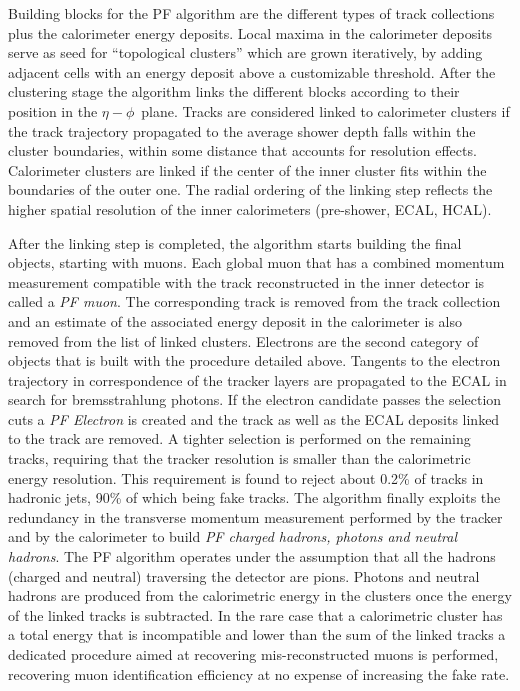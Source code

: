 Building blocks for the PF algorithm are the different types of track collections plus the calorimeter energy deposits. Local maxima in the calorimeter deposits serve as seed for ``topological clusters'' which are grown iteratively, by adding adjacent cells with an energy deposit above a customizable threshold. After the clustering stage the algorithm links the different blocks according to their position in the $\eta-\phi$\ plane. Tracks are considered linked to calorimeter clusters if the track trajectory propagated to the average shower depth falls within the cluster boundaries, within some distance that accounts for resolution effects. Calorimeter clusters are linked if the center of the inner cluster fits within the boundaries of the outer one. The radial ordering of the linking step reflects the higher spatial resolution of the inner calorimeters (pre-shower, ECAL, HCAL). 

After the linking step is completed, the algorithm starts building the final objects, starting with muons. Each global muon that has a combined momentum measurement compatible with the track reconstructed in the inner detector is called a \emph{PF muon}. The corresponding track is removed from the track collection and an estimate of the associated energy deposit in the calorimeter is also removed from the list of linked clusters. Electrons are the second category of objects that is built with the procedure detailed above. Tangents to the electron trajectory in correspondence of the tracker layers are propagated to the ECAL in search for bremsstrahlung photons. If the electron candidate passes the selection cuts a \emph{PF Electron} is created and the track as well as the ECAL deposits linked to the track are removed. A tighter selection is performed on the remaining tracks, requiring that the tracker \pT resolution is smaller than the calorimetric energy resolution. This requirement is found to reject about 0.2\% of tracks in hadronic jets, 90\% of which being fake tracks. 
The algorithm finally exploits the redundancy in the transverse momentum measurement performed by the tracker and by the calorimeter to build \emph{PF charged hadrons, photons and neutral hadrons}. The PF algorithm operates under the assumption that all the hadrons (charged and neutral) traversing the detector are pions. Photons and neutral hadrons are produced from the calorimetric energy in the clusters once the energy of the linked tracks is subtracted. In the rare case that a calorimetric cluster has a total energy that is incompatible and lower than the sum of the linked tracks a dedicated procedure aimed at recovering mis-reconstructed muons is performed, recovering muon identification efficiency at no expense of increasing the fake rate.%

